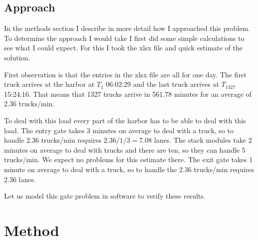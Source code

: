 \documentclass{article}
\begin{document}
\subsection{Approach}

In the methods section I describe in more detail how I approached this
problem. To determine the approach I would take I first did some
simple calculations to see what I could expect. For this I took the
xlsx file and quick estimate of the solution.

First observation is that the entries in the xlsx file are all for one
day. The first truck arrives at the harbor at $T_1$ 06:02:29 and the
last truck arrives at $T_{1327}$ 15:24:16. That means that 1327 trucks
arrive in 561.78 minutes for an average of 2.36 trucks/min.

To deal with this load every part of the harbor has to be able to deal
with this load. The entry gate takes 3 minutes on average to deal with
a truck, so to handle 2.36 trucks/min requires $2.36 / 1/3 = 7.08$
lanes. The stack modules take 2 minutes on average to deal with trucks
and there are ten, so they can handle 5 trucks/min. We expect no
problems for this estimate there. The exit gate takes 1 minute on
average to deal with a truck, so to handle the 2.36 trucks/min
requires 2.36 lanes.

Let us model this gate problem in software to verify these results.

\section{Method}
\end{document}

